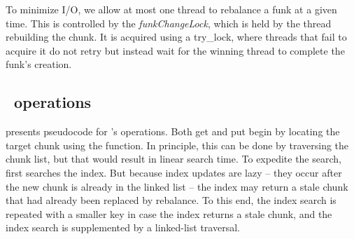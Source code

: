 To minimize I/O, we allow at most one thread to rebalance a funk at a given time. This is controlled by 
the  \emph{funkChangeLock}, which is held by the thread rebuilding the  chunk. 
It is acquired using a try\_lock, where threads that fail to acquire it do not retry but instead wait for the winning thread to complete the funk's creation.

\subsection{\sys\ operations}
\label{ssec:ops}

  presents pseudocode for \sys's operations. 
Both get and put begin by locating the target chunk using the  function. In principle, this can be done by traversing the chunk list, but that would result in linear search time. To expedite the search,    first searches the index. But because index updates are lazy -- they occur after the new chunk is already
in the linked list --  the index may return a stale chunk that had already been replaced by rebalance. To this end, the index search is repeated with a smaller key in case the index returns a stale chunk, and the index search is supplemented by a linked-list traversal. 


